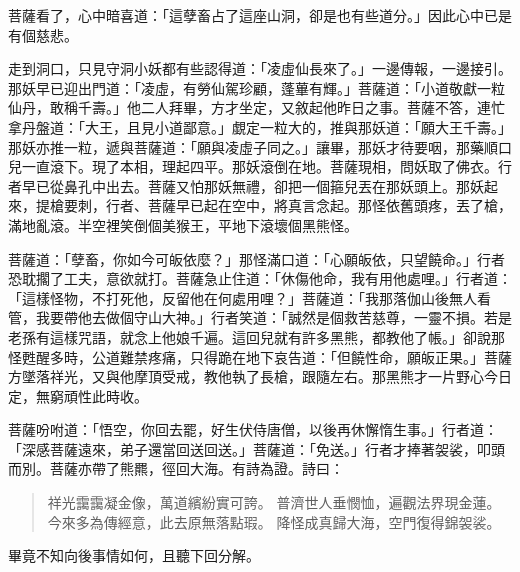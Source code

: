 菩薩看了，心中暗喜道：「這孽畜占了這座山洞，卻是也有些道分。」因此心中已是有個慈悲。

走到洞口，只見守洞小妖都有些認得道：「凌虛仙長來了。」一邊傳報，一邊接引。那妖早已迎出門道：「凌虛，有勞仙駕珍顧，蓬蓽有輝。」菩薩道：「小道敬獻一粒仙丹，敢稱千壽。」他二人拜畢，方才坐定，又敘起他昨日之事。菩薩不答，連忙拿丹盤道：「大王，且見小道鄙意。」覷定一粒大的，推與那妖道：「願大王千壽。」那妖亦推一粒，遞與菩薩道：「願與凌虛子同之。」讓畢，那妖才待要咽，那藥順口兒一直滾下。現了本相，理起四平。那妖滾倒在地。菩薩現相，問妖取了佛衣。行者早已從鼻孔中出去。菩薩又怕那妖無禮，卻把一個箍兒丟在那妖頭上。那妖起來，提槍要刺，行者、菩薩早已起在空中，將真言念起。那怪依舊頭疼，丟了槍，滿地亂滾。半空裡笑倒個美猴王，平地下滾壞個黑熊怪。

菩薩道：「孽畜，你如今可皈依麼？」那怪滿口道：「心願皈依，只望饒命。」行者恐耽擱了工夫，意欲就打。菩薩急止住道：「休傷他命，我有用他處哩。」行者道：「這樣怪物，不打死他，反留他在何處用哩？」菩薩道：「我那落伽山後無人看管，我要帶他去做個守山大神。」行者笑道：「誠然是個救苦慈尊，一靈不損。若是老孫有這樣咒語，就念上他娘千遍。這回兒就有許多黑熊，都教他了帳。」卻說那怪甦醒多時，公道難禁疼痛，只得跪在地下哀告道：「但饒性命，願皈正果。」菩薩方墜落祥光，又與他摩頂受戒，教他執了長槍，跟隨左右。那黑熊才一片野心今日定，無窮頑性此時收。

菩薩吩咐道：「悟空，你回去罷，好生伏侍唐僧，以後再休懈惰生事。」行者道：「深感菩薩遠來，弟子還當回送回送。」菩薩道：「免送。」行者才捧著袈裟，叩頭而別。菩薩亦帶了熊羆，徑回大海。有詩為證。詩曰：
\begin{quote}
祥光靄靄凝金像，萬道繽紛實可誇。
普濟世人垂憫恤，遍觀法界現金蓮。
今來多為傳經意，此去原無落點瑕。
降怪成真歸大海，空門復得錦袈裟。
\end{quote}

畢竟不知向後事情如何，且聽下回分解。
